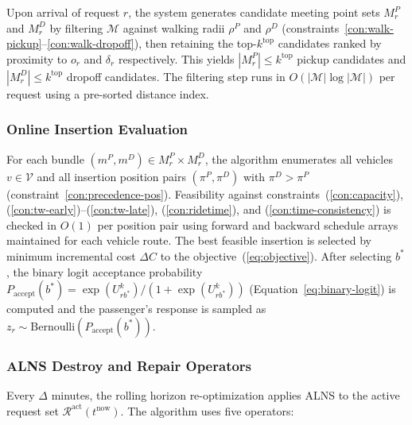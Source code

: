 Upon arrival of request $r$, the system generates candidate meeting point sets $M_r^P$
and $M_r^D$ by filtering $\mathcal{M}$ against walking radii $\rho^P$ and $\rho^D$
(constraints~\ref{con:walk-pickup}--\ref{con:walk-dropoff}), then retaining the
top-$k^{\text{top}}$ candidates ranked by proximity to $o_r$ and $\delta_r$ respectively.
This yields $|M_r^P| \leq k^{\text{top}}$ pickup candidates and
$|M_r^D| \leq k^{\text{top}}$ dropoff candidates. The filtering step runs in
$O(|\mathcal{M}| \log |\mathcal{M}|)$ per request using a pre-sorted distance index.

\subsubsection{Online Insertion Evaluation}

For each bundle $(m^P, m^D) \in M_r^P \times M_r^D$, the algorithm enumerates all
vehicles $v \in \mathcal{V}$ and all insertion position pairs $(\pi^P, \pi^D)$ with
$\pi^D > \pi^P$ (constraint~\ref{con:precedence-pos}). Feasibility against
constraints~(\ref{con:capacity}), (\ref{con:tw-early})--(\ref{con:tw-late}),
(\ref{con:ridetime}), and (\ref{con:time-consistency}) is checked in $O(1)$ per position
pair using forward and backward schedule arrays maintained for each vehicle route. The
best feasible insertion is selected by minimum incremental cost $\Delta C$ to the
objective~(\ref{eq:objective}). After selecting $b^*$, the binary logit acceptance probability
$P_{\text{accept}}(b^*) = \exp(U_{rb^*}^k) / (1 + \exp(U_{rb^*}^k))$
(Equation~\ref{eq:binary-logit}) is computed and the passenger's response is sampled
as $z_r \sim \text{Bernoulli}(P_{\text{accept}}(b^*))$.

\subsubsection{ALNS Destroy and Repair Operators}

Every $\Delta$ minutes, the rolling horizon re-optimization applies ALNS
\citep{ropke2006} to the active request set $\mathcal{R}^{\text{act}}(t^{\text{now}})$.
The algorithm uses five operators:

